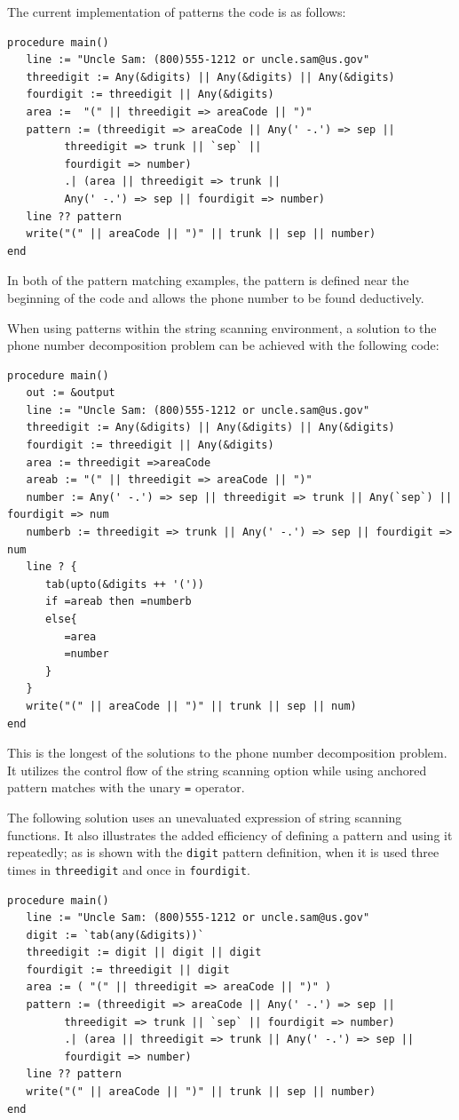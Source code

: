 \documentclass{article}
\begin{document}
The current implementation of patterns the code is as follows:
\begin{verbatim}
procedure main()
   line := "Uncle Sam: (800)555-1212 or uncle.sam@us.gov"
   threedigit := Any(&digits) || Any(&digits) || Any(&digits)
   fourdigit := threedigit || Any(&digits)
   area :=  "(" || threedigit => areaCode || ")" 
   pattern := (threedigit => areaCode || Any(' -.') => sep || 
         threedigit => trunk || `sep` || 
         fourdigit => number) 
         .| (area || threedigit => trunk || 
         Any(' -.') => sep || fourdigit => number)
   line ?? pattern
   write("(" || areaCode || ")" || trunk || sep || number) 
end
\end{verbatim}
In both of the pattern matching examples, the pattern is defined near the beginning of the code and allows the phone number to be found deductively. 

When using patterns within the string scanning environment, a solution to the phone number decomposition problem can be achieved with the following code:
\begin{verbatim}
procedure main()
   out := &output
   line := "Uncle Sam: (800)555-1212 or uncle.sam@us.gov"
   threedigit := Any(&digits) || Any(&digits) || Any(&digits)
   fourdigit := threedigit || Any(&digits)
   area := threedigit =>areaCode
   areab := "(" || threedigit => areaCode || ")"
   number := Any(' -.') => sep || threedigit => trunk || Any(`sep`) || fourdigit => num
   numberb := threedigit => trunk || Any(' -.') => sep || fourdigit => num
   line ? {
      tab(upto(&digits ++ '('))
      if =areab then =numberb
      else{
         =area
         =number
      }
   }
   write("(" || areaCode || ")" || trunk || sep || num) 
end
\end{verbatim}
This is the longest of the solutions to the phone number decomposition problem.  It utilizes the control flow of the string scanning option while using anchored pattern matches with the unary \texttt{=} operator.

The following solution uses an unevaluated expression of string scanning functions.  It also illustrates the added efficiency of defining a pattern and using it repeatedly; as is shown with the \texttt{digit} pattern definition, when it is used three times in \texttt{threedigit} and once in \texttt{fourdigit}. 
\begin{verbatim}
procedure main()
   line := "Uncle Sam: (800)555-1212 or uncle.sam@us.gov"
   digit := `tab(any(&digits))`
   threedigit := digit || digit || digit
   fourdigit := threedigit || digit
   area := ( "(" || threedigit => areaCode || ")" )
   pattern := (threedigit => areaCode || Any(' -.') => sep ||
         threedigit => trunk || `sep` || fourdigit => number) 
         .| (area || threedigit => trunk || Any(' -.') => sep ||
         fourdigit => number)
   line ?? pattern
   write("(" || areaCode || ")" || trunk || sep || number) 
end
\end{verbatim}
\end{document}
